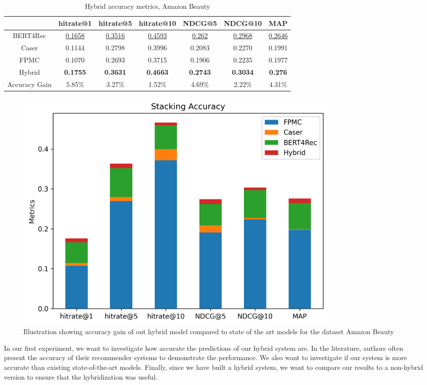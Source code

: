 \begin{table}[htbp!]
\centering
 \begin{tabular}{||c c c c c c c||} 
 \hline
  & hitrate@1 & hitrate@5 & hitrate@10 & NDCG@5 & NDCG@10 & MAP\\ [0.5ex] 
 \hline\hline
 BERT4Rec & \underline{0.1658} & \underline{0.3516} & \underline{0.4593} & \underline{0.262} & \underline{0.2968} & \underline{0.2646} \\ 
 Caser & 0.1144 & 0.2798 & 0.3996 & 0.2083 & 0.2270 & 0.1991 \\
 FPMC & 0.1070 & 0.2693 & 0.3715 & 0.1906 & 0.2235 &  0.1977 \\
 \hline
 Hybrid & \textbf{0.1755} & \textbf{0.3631} & \textbf{0.4663} & \textbf{0.2743} & \textbf{0.3034} & \textbf{0.276} \\ 
 Accuracy Gain & 5.85\% & 3.27\% & 1.52\% & 4.69\% & 2.22\% & 4.31\% \\
 \hline
\end{tabular}
\caption{Hybrid accuracy metrics, Amazon Beauty}
\label{tab:accuracy_hybrid_beauty}
\end{table}

\begin{figure}[htbp!]
\centering
\includegraphics[width=0.8\textwidth]{images/plots/stacking_accuracy_beauty.png}
\caption{Illustration showing accuracy gain of out hybrid model compared to state of the art models for the dataset Amazon Beauty}
\label{fig:accuracy_hybrid_beauty}
\end{figure}

In our first experiment, we want to investigate how accurate the predictions of our hybrid system are. In the literature, authors often present the accuracy of their recommender systems to demonstrate the performance\cite{sun2019bert4rec,rendlefactorizing}. We also want to investigate if our system is more accurate than existing state-of-the-art models. Finally, since we have built a hybrid system, we want to compare our results to a non-hybrid version to ensure that the hybridization was useful.

